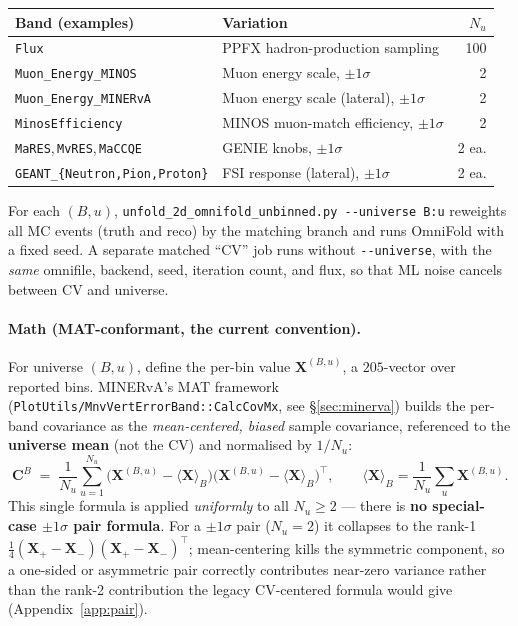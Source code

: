 \documentclass[12pt]{article}
\newcommand{\T}{^{\!\top}}
\begin{document}
\begin{center}
\begin{tabular}{@{}llr@{}}
\toprule
Band (examples) & Variation & $N_{u}$ \\
\midrule
\texttt{Flux} & PPFX hadron-production sampling & 100 \\
\texttt{Muon\_Energy\_MINOS} & Muon energy scale, $\pm 1\sigma$ & 2 \\
\texttt{Muon\_Energy\_MINERvA} & Muon energy scale (lateral), $\pm1\sigma$ & 2 \\
\texttt{MinosEfficiency} & MINOS muon-match efficiency, $\pm 1\sigma$ & 2 \\
\texttt{MaRES},\,\texttt{MvRES},\,\texttt{MaCCQE} & GENIE knobs, $\pm 1\sigma$ & 2 ea. \\
\texttt{GEANT\_\{Neutron,Pion,Proton\}} & FSI response (lateral), $\pm1\sigma$ & 2 ea. \\
\bottomrule
\end{tabular}
\end{center}
For each $(B,u)$, \texttt{unfold\_2d\_omnifold\_unbinned.py
-{}-universe B:u} reweights all MC events (truth and reco) by the
matching branch and runs OmniFold with a fixed seed. A separate
matched ``CV'' job runs without \texttt{-{}-universe}, with the
\emph{same} omnifile, backend, seed, iteration count, and flux, so
that ML noise cancels between CV and universe.

\paragraph{Math (MAT-conformant, the current convention).}
For universe $(B,u)$, define the per-bin value
$\mathbf{X}^{(B,u)}$, a $205$-vector over reported bins. MINERvA's MAT
framework
(\texttt{PlotUtils/MnvVertErrorBand::CalcCovMx}, see \S\ref{sec:minerva})
builds the per-band covariance as the \emph{mean-centered, biased}
sample covariance, referenced to the \textbf{universe mean} (not the
CV) and normalised by $1/N_{u}$:
\begin{equation}
\boxed{\;
\mathbf{C}^{B}
\;=\;
\frac{1}{N_{u}}\sum_{u=1}^{N_{u}}
\big(\mathbf{X}^{(B,u)} - \langle\mathbf{X}\rangle_{B}\big)
\big(\mathbf{X}^{(B,u)} - \langle\mathbf{X}\rangle_{B}\big)\T,
\qquad
\langle\mathbf{X}\rangle_{B} = \frac{1}{N_{u}}\sum_{u}\mathbf{X}^{(B,u)}.
\;}
\label{eq:matcov}
\end{equation}
This single formula is applied \emph{uniformly} to all $N_{u}\ge 2$ ---
there is \textbf{no special-case $\pm1\sigma$ pair formula}. For a
$\pm1\sigma$ pair ($N_{u}=2$) it collapses to the rank-1
$\tfrac14(\mathbf{X}_{+}-\mathbf{X}_{-})(\mathbf{X}_{+}-\mathbf{X}_{-})\T$;
mean-centering kills the symmetric component, so a one-sided or
asymmetric pair correctly contributes near-zero variance rather than
the rank-2 contribution the legacy CV-centered formula would give
(Appendix~\ref{app:pair}).
\end{document}

